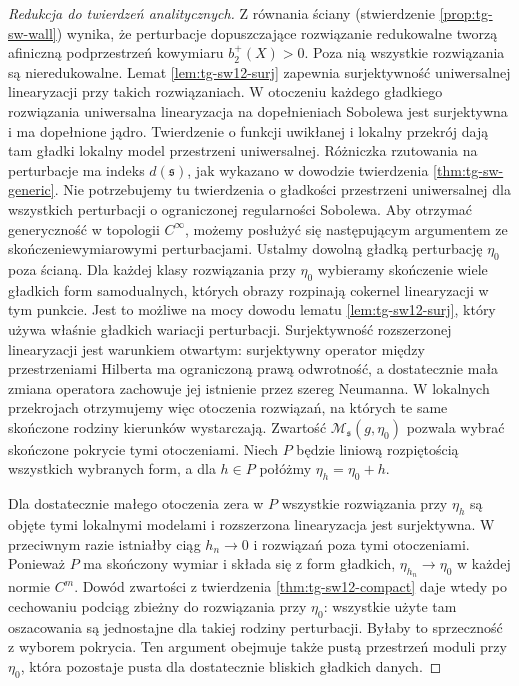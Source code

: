 \begin{proof}[Redukcja do twierdzeń analitycznych]
Z równania ściany (stwierdzenie \ref{prop:tg-sw-wall})
wynika, że perturbacje dopuszczające rozwiązanie
redukowalne tworzą afiniczną podprzestrzeń kowymiaru
$b_2^+(X)>0$. Poza nią wszystkie rozwiązania są
nieredukowalne. Lemat \ref{lem:tg-sw12-surj} zapewnia
surjektywność uniwersalnej linearyzacji przy takich
rozwiązaniach. W otoczeniu każdego gładkiego rozwiązania
uniwersalna linearyzacja na dopełnieniach Sobolewa
jest surjektywna i ma dopełnione jądro.
Twierdzenie o funkcji uwikłanej i lokalny przekrój
dają tam gładki lokalny model przestrzeni uniwersalnej.
Różniczka rzutowania na perturbacje ma indeks
$d(\mathfrak s)$, jak wykazano w dowodzie twierdzenia
\ref{thm:tg-sw-generic}.
Nie potrzebujemy tu twierdzenia o gładkości
przestrzeni uniwersalnej dla wszystkich perturbacji
o ograniczonej regularności Sobolewa.
Aby otrzymać generyczność w topologii $C^\infty$,
możemy posłużyć się następującym argumentem
ze skończeniewymiarowymi perturbacjami.
Ustalmy dowolną gładką perturbację $\eta_0$
poza ścianą. Dla każdej klasy rozwiązania
przy $\eta_0$ wybieramy skończenie wiele
gładkich form samodualnych, których obrazy
rozpinają cokernel linearyzacji w tym punkcie.
Jest to możliwe na mocy dowodu lematu
\ref{lem:tg-sw12-surj}, który używa właśnie
gładkich wariacji perturbacji.
Surjektywność rozszerzonej linearyzacji
jest warunkiem otwartym: surjektywny operator
między przestrzeniami Hilberta ma ograniczoną
prawą odwrotność, a dostatecznie mała zmiana
operatora zachowuje jej istnienie przez szereg
Neumanna. W lokalnych przekrojach otrzymujemy
więc otoczenia rozwiązań, na których te same
skończone rodziny kierunków wystarczają.
Zwartość $\mathcal M_{\mathfrak s}(g,\eta_0)$
pozwala wybrać skończone pokrycie tymi otoczeniami.
Niech $P$ będzie liniową rozpiętością wszystkich
wybranych form, a dla $h\in P$ połóżmy
$\eta_h=\eta_0+h$.

Dla dostatecznie małego otoczenia zera w $P$
wszystkie rozwiązania przy $\eta_h$ są objęte
tymi lokalnymi modelami i rozszerzona
linearyzacja jest surjektywna.
W przeciwnym razie istniałby ciąg $h_n\to0$
i rozwiązań poza tymi otoczeniami.
Ponieważ $P$ ma skończony wymiar i składa się
z form gładkich, $\eta_{h_n}\to\eta_0$
w każdej normie $C^m$. Dowód zwartości
z twierdzenia \ref{thm:tg-sw12-compact}
daje wtedy po cechowaniu podciąg zbieżny
do rozwiązania przy $\eta_0$: wszystkie
użyte tam oszacowania są jednostajne dla
takiej rodziny perturbacji.
Byłaby to sprzeczność z wyborem pokrycia.
Ten argument obejmuje także pustą przestrzeń
moduli przy $\eta_0$, która pozostaje pusta
dla dostatecznie bliskich gładkich danych.


\end{proof}
